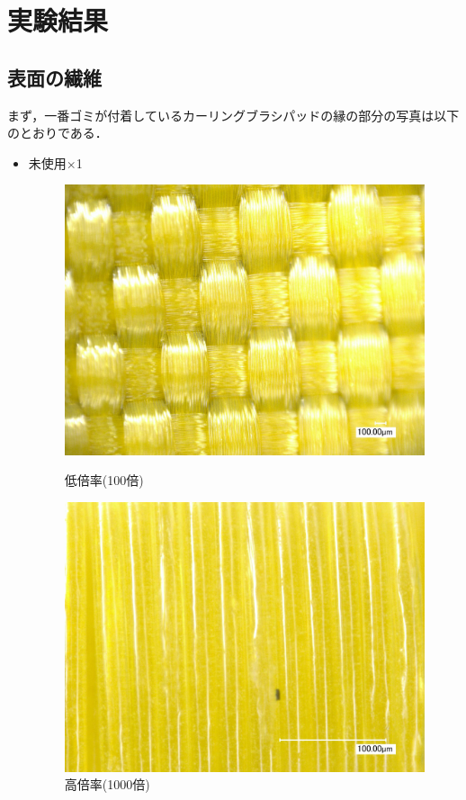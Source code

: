 \documentclass[main]{subfiles}
\begin{document}
\chapter{実験結果}
\section{表面の繊維}

まず，一番ゴミが付着しているカーリングブラシパッドの縁の部分の写真は以下のとおりである．

\begin{itemize}
    \item 未使用×1
    \begin{figure}[H]
        \centering
        \begin{minipage}[htbp]{0.45\linewidth}
            \centering
            \includegraphics[keepaspectratio, width=0.8\linewidth]{figures/縁/カーリングパッド未使用低倍率.jpg}
            \caption{低倍率(100倍)}
            \label{fig:label}
        \end{minipage}
        \begin{minipage}[htbp]{0.45\linewidth}
            \centering
            \includegraphics[keepaspectratio, width=0.8\linewidth]{figures/縁/カーリングパッド未使用.jpg}
            \caption{高倍率(1000倍)}
            \label{fig:label}
        \end{minipage}
    \end{figure}
    

\end{itemize}
\end{document}
